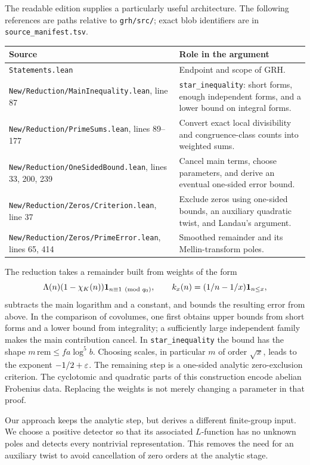 \documentclass[11pt]{article}
\theoremstyle{remark}\newtheorem{remark}[theorem]{Remark}
\begin{document}
The readable edition supplies a particularly useful architecture. The following references are paths relative to \texttt{grh/src/}; exact blob identifiers are in \texttt{source\_manifest.tsv}.
\begin{center}\small
\begin{tabular}{@{}>{\raggedright\arraybackslash}p{.42\linewidth}>{\raggedright\arraybackslash}p{.51\linewidth}@{}}
\toprule
Source & Role in the argument\\\midrule
\texttt{Statements.lean} & Endpoint and scope of GRH.\\
\texttt{New/Reduction/MainInequality.lean}, line 87 & \texttt{star\_inequality}: short forms, enough independent forms, and a lower bound on integral forms.\\
\texttt{New/Reduction/PrimeSums.lean}, lines 89--177 & Convert exact local divisibility and congruence-class counts into weighted sums.\\
\texttt{New/Reduction/OneSidedBound.lean}, lines 33, 200, 239 & Cancel main terms, choose parameters, and derive an eventual one-sided error bound.\\
\texttt{New/Reduction/Zeros/Criterion.lean}, line 37 & Exclude zeros using one-sided bounds, an auxiliary quadratic twist, and Landau's argument.\\
\texttt{New/Reduction/Zeros/PrimeError.lean}, lines 65, 414 & Smoothed remainder and its Mellin-transform poles.\\\bottomrule
\end{tabular}
\end{center}
The reduction takes a remainder built from weights of the form
\[
 \Lambda(n)(1-\chi_K(n))\mathbf 1_{n\equiv1\pmod {q_0}},\qquad
 k_x(n)=(1/n-1/x)\mathbf 1_{n\le x},
\]
subtracts the main logarithm and a constant, and bounds the resulting error from above. In the comparison of covolumes, one first obtains upper bounds from short forms and a lower bound from integrality; a sufficiently large independent family makes the main contribution cancel. In \texttt{star\_inequality} the bound has the shape $m\,\mathrm{rem}\le fa\log^5 b$. Choosing scales, in particular $m$ of order $\sqrt x$, leads to the exponent $-1/2+\varepsilon$. The remaining step is a one-sided analytic zero-exclusion criterion. The cyclotomic and quadratic parts of this construction encode abelian Frobenius data. Replacing the weights is not merely changing a parameter in that proof.

Our approach keeps the analytic step, but derives a different finite-group input. We choose a positive detector so that its associated $L$-function has no unknown poles and detects every nontrivial representation. This removes the need for an auxiliary twist to avoid cancellation of zero orders at the analytic stage.
\end{document}
